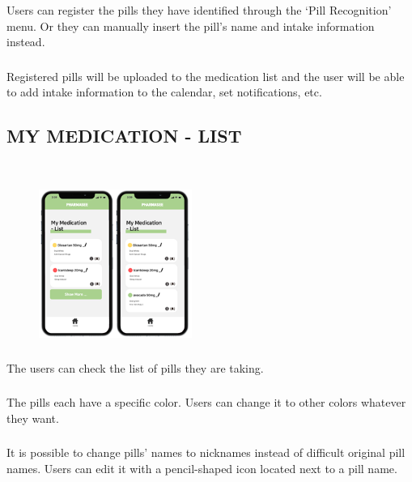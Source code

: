 \documentclass[conference]{IEEEtran}
\begin{document}
\subsubsection{}Users can register the pills they have identified through the ‘Pill Recognition’ menu. Or they can manually insert the pill’s name and intake information instead.\\

\subsubsection{}Registered pills will be uploaded to the medication list and the user will be able to add intake information to the calendar, set notifications, etc.\\

\subsection{MY MEDICATION - LIST}\\
\begin{figure}[h!]
\centering
\includegraphics[width=5cm]{imagefolder/medi_list.png}
\caption{}
\label{fig:map}
\end{figure}

\subsubsection{}The users can check the list of pills they are taking.\\

\subsubsection{}The pills each have a specific color. Users can change it to other colors whatever they want.\\

\subsubsection{}It is possible to change pills’ names to nicknames instead of difficult original pill names. Users can edit it with a pencil-shaped icon located next to a pill name.\\
\end{document}
